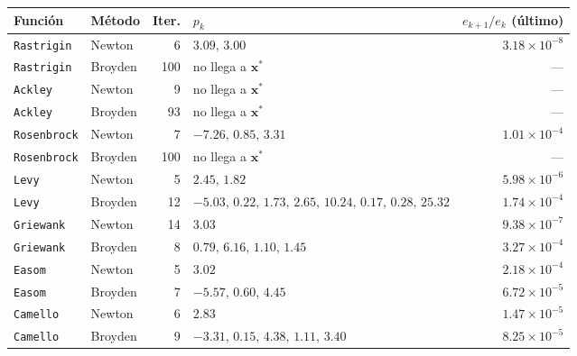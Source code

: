 \begin{tabular}{l l r l r}
\toprule
\rowcolor{Azul1!50}
Función & Método & Iter. & $p_k$ & $e_{k+1}/e_k$ (último) \\
\midrule
\texttt{Rastrigin} & Newton & 6 & $3.09,\,3.00$ & $3.18\times10^{-8}$ \\
\texttt{Rastrigin} & Broyden & 100 & no llega a $\mathbf{x}^*$ & --- \\
\texttt{Ackley} & Newton & 9 & no llega a $\mathbf{x}^*$ & --- \\
\texttt{Ackley} & Broyden & 93 & no llega a $\mathbf{x}^*$ & --- \\
\texttt{Rosenbrock} & Newton & 7 & $-7.26,\,0.85,\,3.31$ & $1.01\times10^{-4}$ \\
\texttt{Rosenbrock} & Broyden & 100 & no llega a $\mathbf{x}^*$ & --- \\
\texttt{Levy} & Newton & 5 & $2.45,\,1.82$ & $5.98\times10^{-6}$ \\
\texttt{Levy} & Broyden & 12 & $-5.03,\,0.22,\,1.73,\,2.65,\,10.24,\,0.17,\,0.28,\,25.32$ & $1.74\times10^{-4}$ \\
\texttt{Griewank} & Newton & 14 & $3.03$ & $9.38\times10^{-7}$ \\
\texttt{Griewank} & Broyden & 8 & $0.79,\,6.16,\,1.10,\,1.45$ & $3.27\times10^{-4}$ \\
\texttt{Easom} & Newton & 5 & $3.02$ & $2.18\times10^{-4}$ \\
\texttt{Easom} & Broyden & 7 & $-5.57,\,0.60,\,4.45$ & $6.72\times10^{-5}$ \\
\texttt{Camello} & Newton & 6 & $2.83$ & $1.47\times10^{-5}$ \\
\texttt{Camello} & Broyden & 9 & $-3.31,\,0.15,\,4.38,\,1.11,\,3.40$ & $8.25\times10^{-5}$ \\
\bottomrule
\end{tabular}
